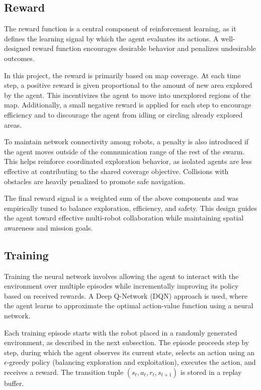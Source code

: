 \subsection{Reward}
The reward function is a central component of reinforcement learning, as it defines the learning signal by which the agent evaluates its actions. A well-designed reward function encourages desirable behavior and penalizes undesirable outcomes.

In this project, the reward is primarily based on map coverage. At each time step, a positive reward is given proportional to the amount of new area explored by the agent. This incentivizes the agent to move into unexplored regions of the map. Additionally, a small negative reward is applied for each step to encourage efficiency and to discourage the agent from idling or circling already explored areas.

To maintain network connectivity among robots, a penalty is also introduced if the agent moves outside of the communication range of the rest of the swarm. This helps reinforce coordinated exploration behavior, as isolated agents are less effective at contributing to the shared coverage objective. Collisions with obstacles are heavily penalized to promote safe navigation.

The final reward signal is a weighted sum of the above components and was empirically tuned to balance exploration, efficiency, and safety. This design guides the agent toward effective multi-robot collaboration while maintaining spatial awareness and mission goals.

\subsection{Training}
Training the neural network involves allowing the agent to interact with the environment over multiple episodes while incrementally improving its policy based on received rewards. A Deep Q-Network (DQN) approach is used, where the agent learns to approximate the optimal action-value function using a neural network.

Each training episode starts with the robot placed in a randomly generated environment, as described in the next subsection. The episode proceeds step by step, during which the agent observes its current state, selects an action using an $\epsilon$-greedy policy (balancing exploration and exploitation), executes the action, and receives a reward. The transition tuple $(s_t, a_t, r_t, s_{t+1})$ is stored in a replay buffer.

